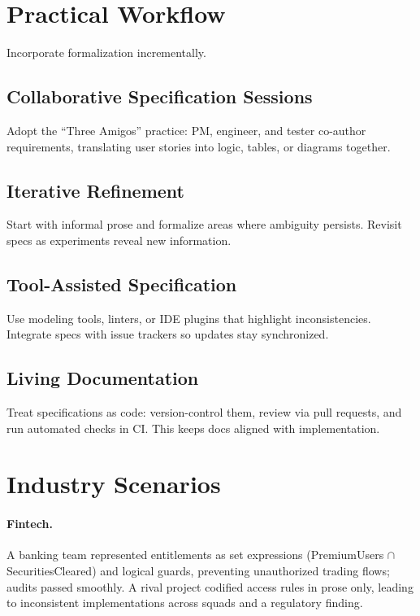 \section{Practical Workflow}
\label{sec:practical-workflow}

Incorporate formalization incrementally.

\subsection{Collaborative Specification Sessions}
Adopt the ``Three Amigos'' practice: PM, engineer, and tester co-author requirements, translating user stories into logic, tables, or diagrams together.

\subsection{Iterative Refinement}
Start with informal prose and formalize areas where ambiguity persists. Revisit specs as experiments reveal new information.

\subsection{Tool-Assisted Specification}
Use modeling tools, linters, or IDE plugins that highlight inconsistencies. Integrate specs with issue trackers so updates stay synchronized.

\subsection{Living Documentation}
Treat specifications as code: version-control them, review via pull requests, and run automated checks in CI. This keeps docs aligned with implementation.

\section{Industry Scenarios}
\label{sec:req-spec-examples}

\paragraph{Fintech.} A banking team represented entitlements as set expressions (PremiumUsers $\cap$ SecuritiesCleared) and logical guards, preventing unauthorized trading flows; audits passed smoothly. A rival project codified access rules in prose only, leading to inconsistent implementations across squads and a regulatory finding.

